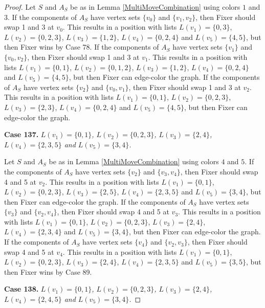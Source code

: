 \documentclass[12pt]{amsart}
\theoremstyle{plain}
\theoremstyle{definition}
\theoremstyle{remark}
\begin{document}
\begin{proof}
Let $S$ and $A_S$ be as in Lemma \ref{MultiMoveCombination} using colors $1$ and $3$. If the components of $A_S$ have vertex sets $\{v_0\}$ and $\{v_1, v_2\}$, then Fixer should swap 1 and 3 at $v_0$. This results in a position with lists $L(v_1) = \{0, 3\}$, $L(v_2) = \{0, 2, 3\}$, $L(v_3) = \{1, 2\}$, $L(v_4) = \{0, 2, 4\}$ and $L(v_5) = \{4, 5\}$, but then Fixer wins by Case 78.
If the components of $A_S$ have vertex sets $\{v_1\}$ and $\{v_0, v_2\}$, then Fixer should swap 1 and 3 at $v_1$. This results in a position with lists $L(v_1) = \{0, 1\}$, $L(v_2) = \{0, 1, 2\}$, $L(v_3) = \{1, 2\}$, $L(v_4) = \{0, 2, 4\}$ and $L(v_5) = \{4, 5\}$, but then Fixer can edge-color the graph.
If the components of $A_S$ have vertex sets $\{v_2\}$ and $\{v_0, v_1\}$, then Fixer should swap 1 and 3 at $v_2$. This results in a position with lists $L(v_1) = \{0, 1\}$, $L(v_2) = \{0, 2, 3\}$, $L(v_3) = \{2, 3\}$, $L(v_4) = \{0, 2, 4\}$ and $L(v_5) = \{4, 5\}$, but then Fixer can edge-color the graph.

\noindent\textbf{Case 137.  }\textit{$L(v_1) = \{0, 1\}$, $L(v_2) = \{0, 2, 3\}$, $L(v_3) = \{2, 4\}$, $L(v_4) = \{2, 3, 5\}$ and $L(v_5) = \{3, 4\}$.}

Let $S$ and $A_S$ be as in Lemma \ref{MultiMoveCombination} using colors $4$ and $5$. If the components of $A_S$ have vertex sets $\{v_2\}$ and $\{v_3, v_4\}$, then Fixer should swap 4 and 5 at $v_2$. This results in a position with lists $L(v_1) = \{0, 1\}$, $L(v_2) = \{0, 2, 3\}$, $L(v_3) = \{2, 5\}$, $L(v_4) = \{2, 3, 5\}$ and $L(v_5) = \{3, 4\}$, but then Fixer can edge-color the graph.
If the components of $A_S$ have vertex sets $\{v_3\}$ and $\{v_2, v_4\}$, then Fixer should swap 4 and 5 at $v_3$. This results in a position with lists $L(v_1) = \{0, 1\}$, $L(v_2) = \{0, 2, 3\}$, $L(v_3) = \{2, 4\}$, $L(v_4) = \{2, 3, 4\}$ and $L(v_5) = \{3, 4\}$, but then Fixer can edge-color the graph.
If the components of $A_S$ have vertex sets $\{v_4\}$ and $\{v_2, v_3\}$, then Fixer should swap 4 and 5 at $v_4$. This results in a position with lists $L(v_1) = \{0, 1\}$, $L(v_2) = \{0, 2, 3\}$, $L(v_3) = \{2, 4\}$, $L(v_4) = \{2, 3, 5\}$ and $L(v_5) = \{3, 5\}$, but then Fixer wins by Case 89.

\noindent\textbf{Case 138.  }\textit{$L(v_1) = \{0, 1\}$, $L(v_2) = \{0, 2, 3\}$, $L(v_3) = \{2, 4\}$, $L(v_4) = \{2, 4, 5\}$ and $L(v_5) = \{3, 4\}$.}


\end{proof}
\end{document}
